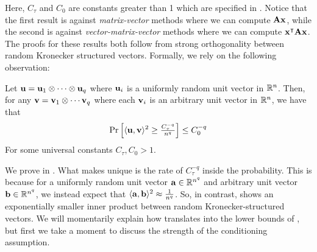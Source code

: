 Here, \(C_\tau\) and \(C_0\) are constants greater than 1 which are specified in .
Notice that the first result is against \emph{matrix-vector} methods where we can compute \(\mathbf{A}\boldsymbol{\mathrm{x}}\), while the second is against \emph{vector-matrix-vector} methods where we can compute \(\boldsymbol{\mathrm{x}}^\intercal\mathbf{A}\boldsymbol{\mathrm{x}}\).
The proofs for these results both follow from strong orthogonality between random Kronecker structured vectors.
Formally, we rely on the following observation:
\begin{lemma}
    \label{lem:kron-unit-vec-conentration}
    Let \(\boldsymbol{\mathrm{u}} = \boldsymbol{\mathrm{u}}_1 \otimes \cdots \otimes \boldsymbol{\mathrm{u}}_q\) where \(\boldsymbol{\mathrm{u}}_i\) is a uniformly random unit vector in \({\mathbb R}^n\).
    Then, for any \(\boldsymbol{\mathrm{v}} = \boldsymbol{\mathrm{v}}_1 \otimes \cdots \boldsymbol{\mathrm{v}}_q\) where each \(\boldsymbol{\mathrm{v}}_i\) is an arbitrary unit vector in \({\mathbb R}^n\), we have that
    \[
    \Pr\left[\langle \boldsymbol{\mathrm{u}}, \boldsymbol{\mathrm{v}}\rangle^2 \geq {\textstyle\frac{C_\tau^{-q}}{n^q}}\right]
    \leq C_0^{-q}
    \]
    For some universal constants \(C_\tau,C_0 > 1\).
\end{lemma}
We prove  in .
What makes  unique is the rate of \(C_\tau^{-q}\) inside the probability.
This is because for a uniformly random unit vector \(\boldsymbol{\mathrm{a}} \in {\mathbb R}^{n^q}\) and arbitrary unit vector \(\boldsymbol{\mathrm{b}}\in{\mathbb R}^{n^q}\), we instead expect that \(\langle \boldsymbol{\mathrm{a}}, \boldsymbol{\mathrm{b}}\rangle^2 \approx \frac{1}{n^q}\).
So, in contrast,  shows an exponentially smaller inner product between random Kronecker-structured vectors.
We will momentarily explain how  translates into the lower bounds of , but first we take a moment to discuss the strength of the conditioning assumption.

